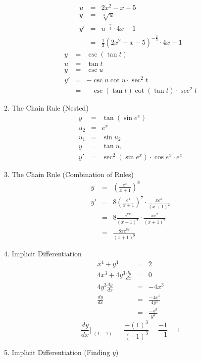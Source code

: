 \documentclass{article}
\begin{document}
\begin{enumerate}
\begin{eqnarray}
        u &=& 2x^2 - x - 5 \\
        y &=& \sqrt[3]{u} \\
        y' &=& u^{-\frac{2}{3}} \cdot 4x - 1 \\
           &=& \frac{1}{3}\left(2x^2 - x - 5\right)^{-\frac{2}{3}} \cdot 4x - 1
    \end{eqnarray}
    \begin{eqnarray}
        y &=& \csc{(\tan{t})} \\
        u &=& \tan{t} \\
        y &=& \csc{u} \\
        y' &=& -\csc{u}\cot{u} \cdot \sec^2{t} \\
           &=& -\csc{(\tan{t})}\cot{(\tan{t})} \cdot \sec^2{t}
    \end{eqnarray}
    \item The Chain Rule (Nested)
    \begin{eqnarray}
        y &=& \tan{(\sin{e^x})} \\
        u_2 &=& e^x \\
        u_1 &=& \sin{u_2} \\
        y &=& \tan{u_1} \\
        y' &=& \sec^2{(\sin{e^x})} \cdot \cos{e^x} \cdot e^x
    \end{eqnarray}
    \item The Chain Rule (Combination of Rules)
    \begin{eqnarray}
        y &=& \left(\frac{e^x}{x+1}\right)^8 \\
        y' &=& 8\left(\frac{e^x}{x+1}\right)^7 \cdot \frac{xe^x}{(x+1)^2} \\
           &=& 8\frac{e^{7x}}{(x+1)^7} \cdot \frac{xe^x}{(x+1)^2} \\
           &=& \frac{8xe^{8x}}{(x+1)^9}
    \end{eqnarray}
    \item Implicit Differentiation
    \begin{eqnarray}
        x^4 + y^4 &=& 2 \\
        4x^3 + 4y^3\frac{dy}{dx} &=& 0 \\
        4y^3\frac{dy}{dx} &=& -4x^3 \\
        \frac{dy}{dx} &=& \frac{-4x^3}{4y^3} \\
                      &=& \frac{-x^3}{y^3}
    \end{eqnarray}
    $$\frac{dy}{dx}\Bigr|_{\substack{(1,-1)}} = \frac{-(1)^3}{(-1)^3} = \frac{-1}{-1} = 1$$
    \item Implicit Differentiation (Finding $y$)

\end{enumerate}
\end{document}
